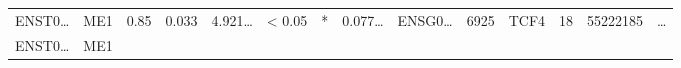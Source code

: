 \documentclass[
]{article}
\begin{document}
\begin{longtable}[]{@{}llllllllllllll@{}}
\begin{minipage}[t]{0.05\columnwidth}\raggedright
ENST0\ldots{}\strut
\end{minipage} & \begin{minipage}[t]{0.04\columnwidth}\raggedright
ME1\strut
\end{minipage} & \begin{minipage}[t]{0.04\columnwidth}\raggedright
0.85\strut
\end{minipage} & \begin{minipage}[t]{0.04\columnwidth}\raggedright
0.033\strut
\end{minipage} & \begin{minipage}[t]{0.05\columnwidth}\raggedright
4.921\ldots{}\strut
\end{minipage} & \begin{minipage}[t]{0.05\columnwidth}\raggedright
\textless{} 0.05\strut
\end{minipage} & \begin{minipage}[t]{0.03\columnwidth}\raggedright
*\strut
\end{minipage} & \begin{minipage}[t]{0.05\columnwidth}\raggedright
0.077\ldots{}\strut
\end{minipage} & \begin{minipage}[t]{0.05\columnwidth}\raggedright
ENSG0\ldots{}\strut
\end{minipage} & \begin{minipage}[t]{0.05\columnwidth}\raggedright
6925\strut
\end{minipage} & \begin{minipage}[t]{0.05\columnwidth}\raggedright
TCF4\strut
\end{minipage} & \begin{minipage}[t]{0.05\columnwidth}\raggedright
18\strut
\end{minipage} & \begin{minipage}[t]{0.05\columnwidth}\raggedright
55222185\strut
\end{minipage} & \begin{minipage}[t]{0.02\columnwidth}\raggedright
\ldots{}\strut
\end{minipage}\tabularnewline
\begin{minipage}[t]{0.05\columnwidth}\raggedright
ENST0\ldots{}\strut
\end{minipage} & \begin{minipage}[t]{0.04\columnwidth}\raggedright
ME1\strut
\end{minipage} & \begin{minipage}[t]{0.04\columnwidth}\raggedright

\end{minipage}
\end{longtable}
\end{document}
